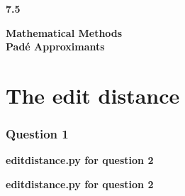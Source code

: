 \documentclass[12pt, a4paper]{article}
\begin{document}
	
	\setlength{\parindent}{0pt}
	\captionsetup{justification=centering}
	\lstset{
		showstringspaces=false
	}
	
	
	\begin{titlepage}
		\LARGE
		\textbf{7.5}
		\begin{center}
			\vspace*{7cm}
			
			\LARGE
			\textbf{Mathematical Methods}
			\\
			\vspace{1cm}
			\textbf{Pad\'e Approximants}
			
			\vspace{0.5cm}
		\end{center}
	\end{titlepage}

\section{The edit distance}	
	
\subsubsection*{Question 1}




\pagebreak
\textbf{edit\textunderscore distance.py for question 2}\centering\label{question2}

\vspace{2cm}

\pagebreak
\textbf{edit\textunderscore distance.py for question 2}\centering\label{question2}

\vspace{2cm}
\end{document}
